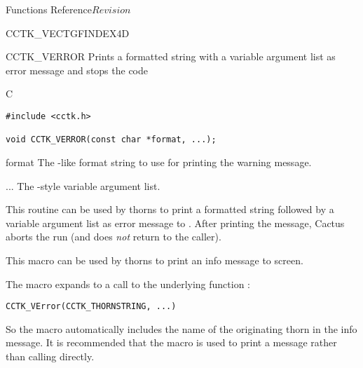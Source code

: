 \begin{cactuspart}{ Functions Reference}{}{$Revision$}
\begin{FunctionDescription}{CCTK\_VECTGFINDEX4D}
\begin{SeeAlsoSection}
\end{SeeAlsoSection}
\end{FunctionDescription}




\begin{FunctionDescription}{CCTK\_VERROR}
\label{CCTK-VERROR}
Prints a formatted string with a variable argument list as error
message and stops the code

\begin{SynopsisSection}
\begin{Synopsis}{C}
\begin{verbatim}
#include <cctk.h>

void CCTK_VERROR(const char *format, ...);
\end{verbatim}
\end{Synopsis}
\end{SynopsisSection}

\begin{ParameterSection}
\begin{Parameter}{format}
The -like format string to use for printing the warning message.
\end{Parameter}
\begin{Parameter}{...}
The -style variable argument list.
\end{Parameter}
\end{ParameterSection}

\begin{Discussion}
This routine can be used by thorns to print a formatted string
followed by a variable argument list as error message to
. After printing the message, Cactus aborts the run (and
 does \emph{not} return to the caller).

This macro can be used by thorns to print an info message to screen.

The macro  expands to a call to the
underlying function :

\begin{verbatim}
CCTK_VError(CCTK_THORNSTRING, ...)
\end{verbatim}

So the macro automatically includes the name of the originating thorn in the
info message. It is recommended that the macro  is used
to print a message rather than calling  directly.
\end{Discussion}


\end{FunctionDescription}
\end{cactuspart}
